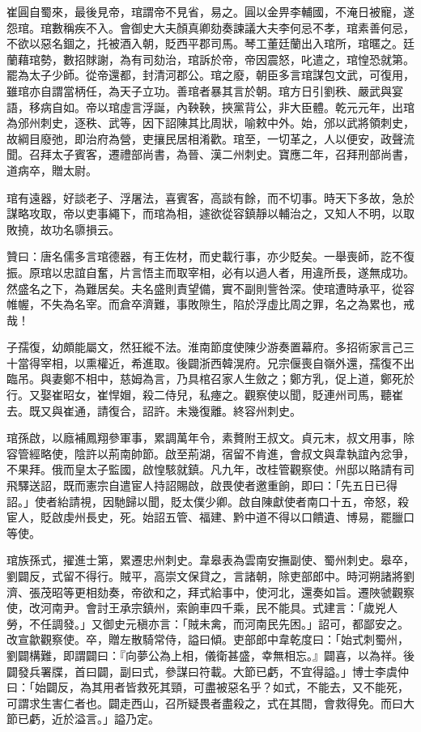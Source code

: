 \begin{pinyinscope}
 崔圓自蜀來，最後見帝，琯謂帝不見省，易之。圓以金畀李輔國，不淹日被寵，遂怨琯。琯數稱疾不入。會御史大夫顏真卿劾奏諫議大夫李何忌不孝，琯素善何忌，不欲以惡名錮之，托被酒入朝，貶西平郡司馬。琴工董廷蘭出入琯所，琯暱之。廷蘭藉琯勢，數招賕謝，為有司劾治，琯訴於帝，帝因震怒，叱遣之，琯惶恐就第。罷為太子少師。從帝還都，封清河郡公。琯之廢，朝臣多言琯謀包文武，可復用，雖琯亦自謂當柄任，為天子立功。善琯者暴其言於朝。琯方日引劉秩、嚴武與宴語，移病自如。帝以琯虛言浮誕，內鞅鞅，挾黨背公，非大臣體。乾元元年，出琯為邠州刺史，逐秩、武等，因下詔陳其比周狀，喻敕中外。始，邠以武將領刺史，故綱目廢弛，即治府為營，吏攘民居相淆歡。琯至，一切革之，人以便安，政聲流聞。召拜太子賓客，遷禮部尚書，為晉、漢二州刺史。寶應二年，召拜刑部尚書，道病卒，贈太尉。



 琯有遠器，好談老子、浮屠法，喜賓客，高談有餘，而不切事。時天下多故，急於謀略攻取，帝以吏事繩下，而琯為相，遽欲從容鎮靜以輔治之，又知人不明，以取敗撓，故功名隳損云。



 贊曰：唐名儒多言琯德器，有王佐材，而史載行事，亦少貶矣。一舉喪師，訖不復振。原琯以忠誼自奮，片言悟主而取宰相，必有以過人者，用違所長，遂無成功。然盛名之下，為難居矣。夫名盛則責望備，實不副則訾咎深。使琯遭時承平，從容帷幄，不失為名宰。而倉卒濟難，事敗隙生，陷於浮虛比周之罪，名之為累也，戒哉！



 子孺復，幼頗能屬文，然狂縱不法。淮南節度使陳少游奏置幕府。多招術家言己三十當得宰相，以熏權近，希進取。後闢浙西韓滉府。兄宗偃喪自嶺外還，孺復不出臨吊。與妻鄭不相中，慈姆為言，乃具棺召家人生斂之；鄭方乳，促上道，鄭死於行。又娶崔昭女，崔悍媢，殺二侍兒，私瘞之。觀察使以聞，貶連州司馬，聽崔去。既又與崔通，請復合，詔許。未幾復離。終容州刺史。



 琯孫啟，以廕補鳳翔參軍事，累調萬年令，素贅附王叔文。貞元末，叔文用事，除容管經略使，陰許以荊南帥節。啟至荊湖，宿留不肯進，會叔文與韋執誼內忿爭，不果拜。俄而皇太子監國，啟惶駭就鎮。凡九年，改桂管觀察使。州邸以賂請有司飛驛送詔，既而憲宗自遣宦人持詔賜啟，啟畏使者邀重餉，即曰：「先五日已得詔。」使者紿請視，因馳歸以聞，貶太僕少卿。啟自陳獻使者南口十五，帝怒，殺宦人，貶啟虔州長史，死。始詔五管、福建、黔中道不得以口饋遺、博易，罷臘口等使。



 琯族孫式，擢進士第，累遷忠州刺史。韋皋表為雲南安撫副使、蜀州刺史。皋卒，劉闢反，式留不得行。賊平，高崇文保貸之，言諸朝，除吏部郎中。時河朔諸將劉濟、張茂昭等更相劾奏，帝欲和之，拜式給事中，使河北，還奏如旨。遷陜虢觀察使，改河南尹。會討王承宗鎮州，索餉車四千乘，民不能具。式建言：「歲兇人勞，不任調發。」又御史元稹亦言：「賊未禽，而河南民先困。」詔可，都鄙安之。改宣歙觀察使。卒，贈左散騎常侍，謚曰傾。吏部郎中韋乾度曰：「始式刺蜀州，劉闢構難，即謂闢曰：『向夢公為上相，儀衛甚盛，幸無相忘。』闢喜，以為祥。後闢發兵署牒，首曰闢，副曰式，參謀曰符載。大節已虧，不宜得謚。」博士李虞仲曰：「始闢反，為其用者皆救死其頸，可盡被惡名乎？如式，不能去，又不能死，可謂求生害仁者也。闢走西山，召所疑畏者盡殺之，式在其間，會救得免。而曰大節已虧，近於溢言。」謚乃定。




\end{pinyinscope}
